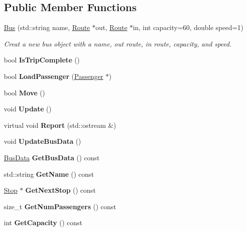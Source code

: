 \subsection*{Public Member Functions}
\begin{DoxyCompactItemize}
\item 
\hyperlink{classBus_aa28c3c318b6993f3a3aebf211daa9217}{Bus} (std\+::string name, \hyperlink{classRoute}{Route} $\ast$out, \hyperlink{classRoute}{Route} $\ast$in, int capacity=60, double speed=1)
\begin{DoxyCompactList}\small\item\em Creat a new bus object with a name, out route, in route, capacity, and speed. \end{DoxyCompactList}\item 
\mbox{\label{classBus_a9c64b0801bf589f121fb0598b70a99b4}} 
bool {\bfseries Is\+Trip\+Complete} ()
\item 
\mbox{\label{classBus_ac3f1c523bc4f97bc8ada8dc488ab3484}} 
bool {\bfseries Load\+Passenger} (\hyperlink{classPassenger}{Passenger} $\ast$)
\item 
\mbox{\label{classBus_a5e667186d6db0916ebab0e4eff3312c8}} 
bool {\bfseries Move} ()
\item 
\mbox{\label{classBus_a9896f74f16966f7621d0dfafff0ec6b4}} 
void {\bfseries Update} ()
\item 
\mbox{\label{classBus_a4e50209dde52bff3de231c8259b38982}} 
virtual void {\bfseries Report} (std\+::ostream \&)
\item 
\mbox{\label{classBus_a38b7ee7b13b3438894e914a6933a6f44}} 
void {\bfseries Update\+Bus\+Data} ()
\item 
\mbox{\label{classBus_aee8d077fc426b73942dec2564b5d066a}} 
\hyperlink{structBusData}{Bus\+Data} {\bfseries Get\+Bus\+Data} () const
\item 
\mbox{\label{classBus_a2143b0563ad48b1b67e114d1ba5342ca}} 
std\+::string {\bfseries Get\+Name} () const
\item 
\mbox{\label{classBus_a6068e9801c6da152f05e40eb26e80b02}} 
\hyperlink{classStop}{Stop} $\ast$ {\bfseries Get\+Next\+Stop} () const
\item 
\mbox{\label{classBus_a346aaa56030d4707886e1db8181e8b55}} 
size\+\_\+t {\bfseries Get\+Num\+Passengers} () const
\item 
\mbox{\label{classBus_a3a1f68e9e2548f981d0150901918922c}} 
int {\bfseries Get\+Capacity} () const
\end{DoxyCompactItemize}


